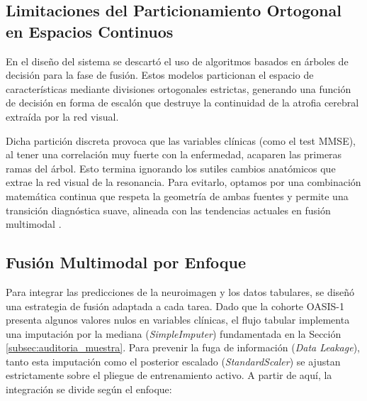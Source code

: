 \documentclass[12pt, oneside, english, spanish]{book}
\begin{document}
\subsection{Limitaciones del Particionamiento Ortogonal en Espacios Continuos} \label{subsec:incompatibilidad_rf}

En el diseño del sistema se descartó el uso de algoritmos basados en árboles de decisión para la fase de fusión. Estos modelos particionan el espacio de características mediante divisiones ortogonales estrictas, generando una función de decisión en forma de escalón que destruye la continuidad de la atrofia cerebral extraída por la red visual. 

Dicha partición discreta provoca que las variables clínicas (como el test MMSE), al tener una correlación muy fuerte con la enfermedad, acaparen las primeras ramas del árbol. Esto termina ignorando los sutiles cambios anatómicos que extrae la red visual de la resonancia. Para evitarlo, optamos por una combinación matemática continua que respeta la geometría de ambas fuentes y permite una transición diagnóstica suave, alineada con las tendencias actuales en fusión multimodal \cite{guan2026survey}.

\subsection{Fusión Multimodal por Enfoque} \label{subsec:mezcla_convexa}

Para integrar las predicciones de la neuroimagen y los datos tabulares, se diseñó una estrategia de fusión adaptada a cada tarea. Dado que la cohorte OASIS-1 presenta algunos valores nulos en variables clínicas, el flujo tabular implementa una imputación por la mediana (\textit{SimpleImputer}) fundamentada en la Sección \ref{subsec:auditoria_muestra}. Para prevenir la fuga de información (\textit{Data Leakage}), tanto esta imputación como el posterior escalado (\textit{StandardScaler}) se ajustan estrictamente sobre el pliegue de entrenamiento activo. A partir de aquí, la integración se divide según el enfoque:
	
\end{document}
